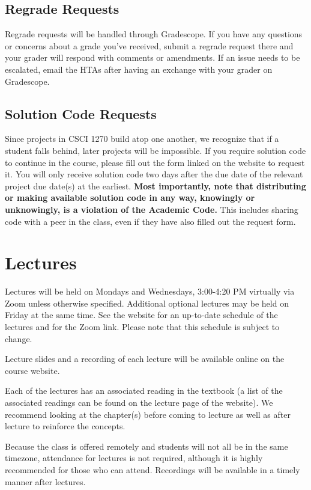 \documentclass{article}
\begin{document}
\subsection{Regrade Requests}
Regrade requests will be handled through Gradescope. If you have any questions or concerns about a grade you've received, submit a regrade request there and your grader will respond with comments or amendments. If an issue needs to be escalated, email the HTAs after having an exchange with your grader on Gradescope.

\subsection{Solution Code Requests}
Since projects in CSCI 1270 build atop one another, we recognize that if a student falls behind, later projects will be impossible. If you require solution code to continue in the course, please fill out the form linked on the website to request it. You will only receive solution code two days after the due date of the relevant project due date(s) at the earliest. \textbf{Most importantly, note that distributing or making available solution code in any way, knowingly or unknowingly, is a violation of the Academic Code.} This includes sharing code with a peer in the class, even if they have also filled out the request form.


\section{Lectures}
Lectures will be held on Mondays and Wednesdays, 3:00-4:20 PM virtually via Zoom unless otherwise specified. Additional optional lectures may be held on Friday at the same time. See the website for an up-to-date schedule of the lectures and for the Zoom link. Please note that this schedule is subject to change.

Lecture slides and a recording of each lecture will be available online on the course website.

Each of the lectures has an associated reading in the textbook (a list of the associated readings can be found on the lecture page of the website). We recommend looking at the chapter(s) before coming to lecture as well as after lecture to reinforce the concepts.

Because the class is offered remotely and students will not all be in the same timezone, attendance for lectures is not required, although it is highly recommended for those who can attend. Recordings will be available in a timely manner after lectures.
\end{document}
